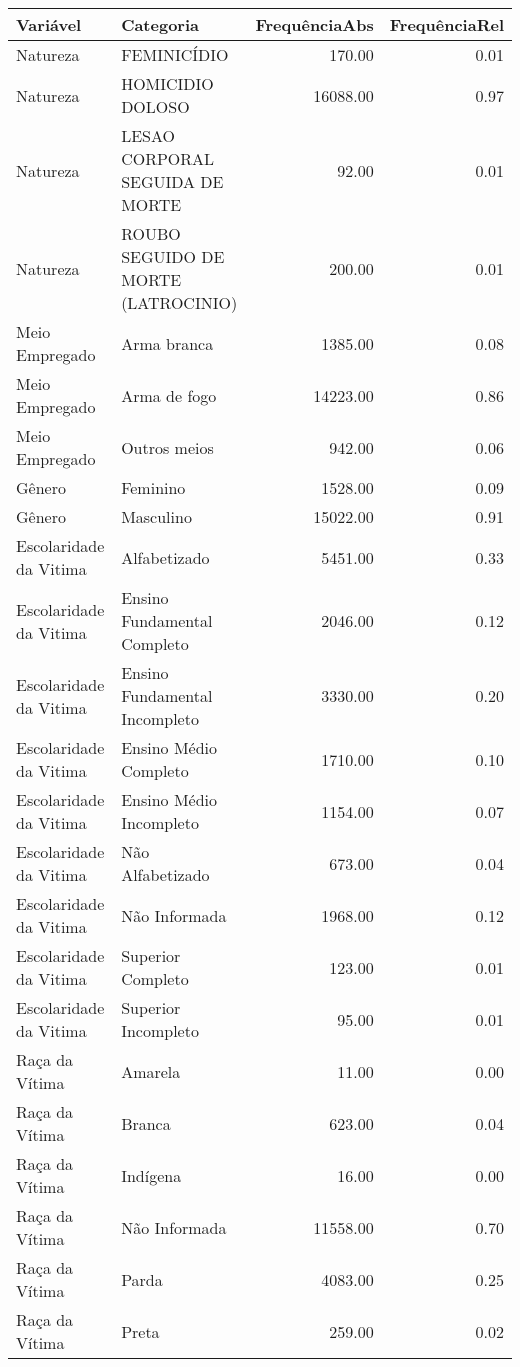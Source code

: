 \begin{table}[ht]
\centering
\begin{tabular}{llrr}
  \hline
Variável & Categoria & FrequênciaAbs & FrequênciaRel \\ 
  \hline
Natureza & FEMINICÍDIO & 170.00 & 0.01 \\ 
  Natureza & HOMICIDIO DOLOSO & 16088.00 & 0.97 \\ 
  Natureza & LESAO CORPORAL SEGUIDA DE MORTE & 92.00 & 0.01 \\ 
  Natureza & ROUBO SEGUIDO DE MORTE (LATROCINIO) & 200.00 & 0.01 \\ 
  Meio Empregado & Arma branca & 1385.00 & 0.08 \\ 
  Meio Empregado & Arma de fogo & 14223.00 & 0.86 \\ 
  Meio Empregado & Outros meios & 942.00 & 0.06 \\ 
  Gênero & Feminino & 1528.00 & 0.09 \\ 
  Gênero & Masculino & 15022.00 & 0.91 \\ 
  Escolaridade da Vitima & Alfabetizado & 5451.00 & 0.33 \\ 
  Escolaridade da Vitima & Ensino Fundamental Completo & 2046.00 & 0.12 \\ 
  Escolaridade da Vitima & Ensino Fundamental Incompleto & 3330.00 & 0.20 \\ 
  Escolaridade da Vitima & Ensino Médio Completo & 1710.00 & 0.10 \\ 
  Escolaridade da Vitima & Ensino Médio Incompleto & 1154.00 & 0.07 \\ 
  Escolaridade da Vitima & Não Alfabetizado & 673.00 & 0.04 \\ 
  Escolaridade da Vitima & Não Informada & 1968.00 & 0.12 \\ 
  Escolaridade da Vitima & Superior Completo & 123.00 & 0.01 \\ 
  Escolaridade da Vitima & Superior Incompleto & 95.00 & 0.01 \\ 
  Raça da Vítima & Amarela & 11.00 & 0.00 \\ 
  Raça da Vítima & Branca & 623.00 & 0.04 \\ 
  Raça da Vítima & Indígena & 16.00 & 0.00 \\ 
  Raça da Vítima & Não Informada & 11558.00 & 0.70 \\ 
  Raça da Vítima & Parda & 4083.00 & 0.25 \\ 
  Raça da Vítima & Preta & 259.00 & 0.02 \\ 

\end{tabular}
\end{table}
